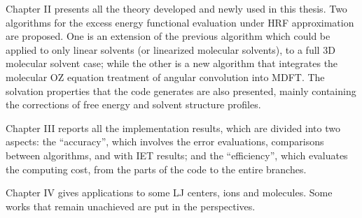Chapter II presents all the theory developed and newly used in this
thesis. Two algorithms for the excess energy functional evaluation
under \acs{HRF} approximation are proposed. One is an extension of
the previous algorithm which could be applied to only linear solvents
(or linearized molecular solvents), to a full 3D molecular solvent
case; while the other is a new algorithm that integrates the molecular
\acs{OZ} equation treatment of angular convolution into \acs{MDFT}.
The solvation properties that the code generates are also presented,
mainly containing the corrections of free energy and solvent structure
profiles.

Chapter III reports all the implementation results, which are divided
into two aspects: the ``accuracy'', which involves the error evaluations,
comparisons between algorithms, and with \acs{IET} results; and the
``efficiency'', which evaluates the computing cost, from the parts
of the code to the entire branches.

Chapter IV gives applications to some LJ centers, ions and molecules.
Some works that remain unachieved are put in the perspectives.
